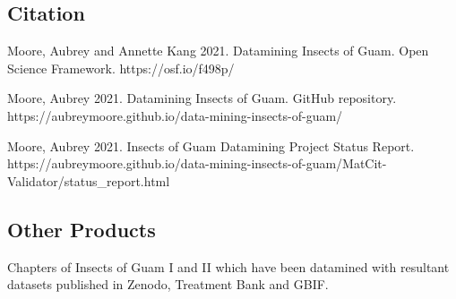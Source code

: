 \documentclass[
]{article}
\begin{document}
%

\hypertarget{citation}{%
\subsection{Citation}\label{citation}}

Moore, Aubrey and Annette Kang 2021. Datamining Insects of Guam. Open
Science Framework. https://osf.io/f498p/

Moore, Aubrey 2021. Datamining Insects of Guam. GitHub repository.
https://aubreymoore.github.io/data-mining-insects-of-guam/

Moore, Aubrey 2021. Insects of Guam Datamining Project Status Report.
https://aubreymoore.github.io/data-mining-insects-of-guam/MatCit-Validator/status\_report.html

\hypertarget{other-products}{%
\subsection{Other Products}\label{other-products}}

Chapters of Insects of Guam I and II which have been datamined with
resultant datasets published in Zenodo, Treatment Bank and GBIF.
\end{document}
